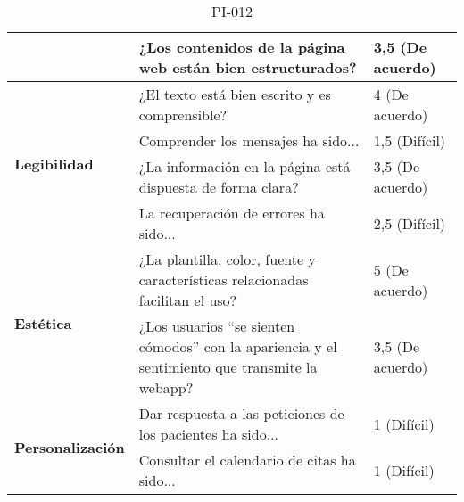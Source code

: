 \begin{table}[htpb]
\begin{tabularx}{\textwidth}{|l|X|l|}
                                          & ¿Los contenidos de la página web están bien estructurados?                                                          & 3,5 (De acuerdo)    \\ \hline
\multirow{4}{*}{\textbf{Legibilidad}}     & ¿El texto está bien escrito y es comprensible?                                                                      & 4 (De acuerdo)      \\ \cline{2-3} 
                                          & Comprender los mensajes ha sido...                                                                                  & 1,5 (Difícil)       \\ \cline{2-3} 
                                          & ¿La información en la página está dispuesta de forma clara?                                                         & 3,5 (De acuerdo)    \\ \cline{2-3} 
                                          & La recuperación de errores ha sido...                                                                               & 2,5 (Difícil)       \\ \hline
\multirow{2}{*}{\textbf{Estética}}        & ¿La plantilla, color, fuente y características relacionadas facilitan el uso?                                       & 5 (De acuerdo)      \\ \cline{2-3} 
                                          & ¿Los usuarios “se sienten cómodos” con la apariencia y el sentimiento que transmite la webapp?                      & 3,5 (De acuerdo)    \\ \hline
\multirow{2}{*}{\textbf{Personalización}} & Dar respuesta a las peticiones de los pacientes ha sido...                                                          & 1 (Difícil)         \\ \cline{2-3} 
                                          & Consultar el calendario de citas ha sido...                                                                         & 1 (Difícil)         \\ \hline
\end{tabularx}
\caption{PI-012}
\end{table}


